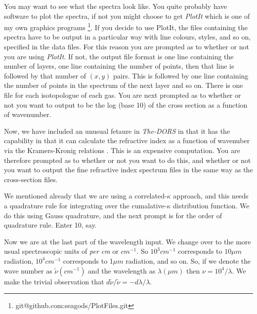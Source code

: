 \documentclass[12pt]{article}
\begin{document}
You may want to see what
the spectra look like. You quite probably have software to plot the spectra, if not you might choose to
 get {\it PlotIt} which is one of my own graphics programs \footnote{git@github.com:seagods/PlotFiles.git}.
If you decide to use PlotIt, the files containing the spectra have to be output in a particular way
with line colours, styles, and so on, specified in the data files.
For this reason you are prompted as to whether or not you are using {\it PlotIt}. If not, the output file
format is one line containing the number of layers, one line containing the number of points, then that line is
followed by that number of $(x,y)$ pairs. This is followed by one line containing the number of points in the spectrum
of the next layer and so on. There is one file for each isotopologue of each gas. You are next prompted as to whether
or not you want to output to be the log (base 10) of the cross section as a function of wavenumber.

Now, we have included an unusual fetaure in {\it The-DORS} in that it has the capability  in that it
 can calculate the refractive index
as a function of wavenuber via the Kramers-Kronig relations \cite{KronKram1:mybib}. This is an expensive
computation. You are therefore prompted as to whether or not you want to do this, and whether or
not you want to output the fine refractive index spectrum files in the same way as the cross-section files.


We mentioned already that we are using a correlated-$\kappa$ approach, and this needs a quadrature rule
for integrating over the cumalative-$\kappa$ distribution function. We do this using Gauss quadrature, and the
next prompt is for the order of quadrature rule. Enter 10, say.

Now we are at the last part of the wavelength input. We change over to the more usual spectroscopic units
of {\it per cm} or $cm^{-1}$. So $10^3 cm^{-1}$ corresponds to $10\mu m$ radiation, $10^4 cm^{-1}$ corresponds
to 1$\mu m$ radiation, and so on. So, if we denote the wave number as $\tilde{\nu} (cm^{-1})$ and the wavelength as $\lambda (\mu m)$
then $\nu=10^4/\lambda$. We make the trivial observation that $d \tilde{\nu}/\tilde{\nu}=-d \lambda / \lambda$.
\end{document}
